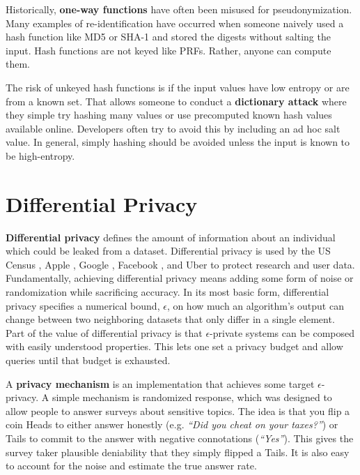 \documentclass[nobib]{tufte-handout}
\begin{document}
Historically, \textbf{one-way functions} have often been misused for
pseudonymization. Many examples of re-identification have occurred when someone
naively used a hash function like MD5 or SHA-1 and stored the digests without
salting the input. Hash functions are not keyed like PRFs. Rather, anyone can
compute them.

The risk of unkeyed hash functions is if the input values have low entropy or
are from a known set. That allows someone to conduct a \textbf{dictionary
attack} where they simple try hashing many values or use precomputed known hash
values available online. Developers often try to avoid this by including an ad
hoc salt value. In general, simply hashing should be avoided unless the input is
known to be high-entropy.

\section{Differential Privacy}

\textbf{Differential privacy} defines the amount of information about an
individual which could be leaked from a dataset. Differential privacy is used by
the US Census \cite{census-differential-privacy}, Apple
\cite{apple-differential-privacy}, Google \cite{google-differential-privacy},
Facebook \cite{facebook-url-release}, and Uber \cite{uber-differential-privacy}
to protect research and user data. Fundamentally, achieving differential privacy
means adding some form of noise or randomization while sacrificing accuracy. In
its most basic form, differential privacy specifies a numerical bound,
$\epsilon$, on how much an algorithm’s output can change between two neighboring
datasets that only differ in a single element. Part of the value of differential
privacy is that $\epsilon$-private systems can be composed with easily
understood properties. This lets one set a privacy budget and allow queries
until that budget is exhausted.

A \textbf{privacy mechanism} is an implementation that achieves some target
$\epsilon$-privacy. A simple mechanism is randomized response, which was
designed to allow people to answer surveys about sensitive topics. The idea is
that you flip a coin Heads to either answer honestly (e.g. \textit{“Did you
cheat on your taxes?”}) or Tails to commit to the answer with negative
connotations (\textit{“Yes”}). This gives the survey taker plausible deniability
that they simply flipped a Tails. It is also easy to account for the noise and
estimate the true answer rate.
\end{document}
